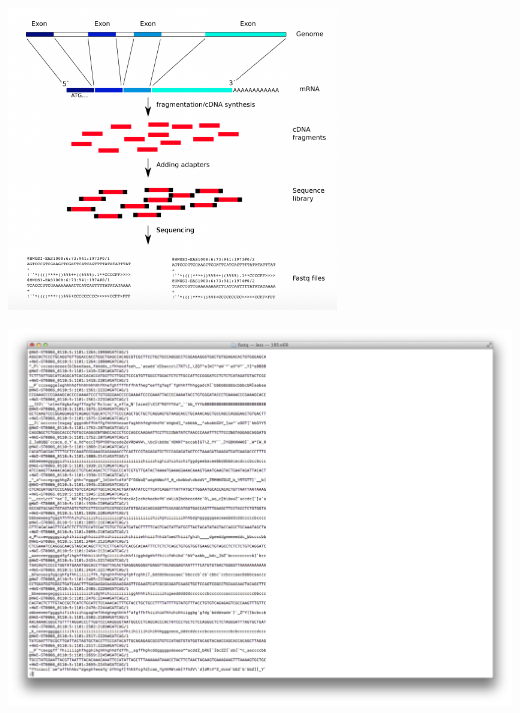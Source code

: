 \documentclass{beamer}\usepackage[]{graphicx}\usepackage[]{color}
\begin{document}
\begin{frame}
\begin{center}
\includegraphics[height=8cm]{Images/RNA2seq2}
\end{center}
\end{frame}

\begin{frame}
\includegraphics[width=15cm]{Images/fastqless.pdf}
\end{frame}
\end{document}
